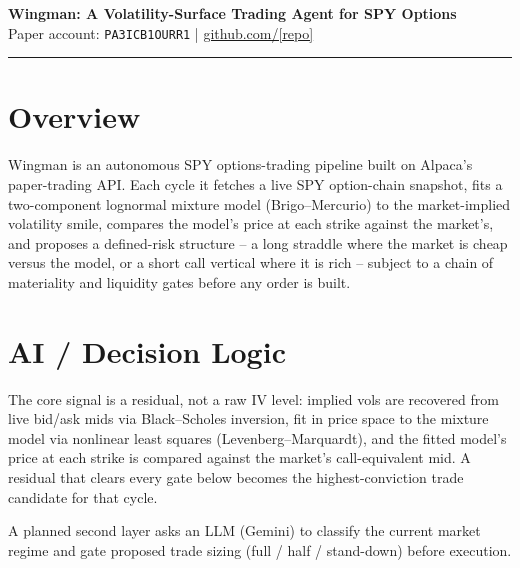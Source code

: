 \documentclass[10pt]{article}
\begin{document}
\begin{center}
{\LARGE \textbf{Wingman: A Volatility-Surface Trading Agent for SPY Options}}\\[4pt]
Paper account: \texttt{PA3ICB1OURR1} \quad|\quad
\href{https://github.com/}{github.com/[repo]}
\end{center}

\vspace{2pt}
\hrule
\vspace{6pt}

\section*{Overview}
Wingman is an autonomous SPY options-trading pipeline built on Alpaca's paper-trading
API. Each cycle it fetches a live SPY option-chain snapshot, fits a two-component
lognormal mixture model (Brigo--Mercurio) to the market-implied volatility smile,
compares the model's price at each strike against the market's, and proposes a
defined-risk structure -- a long straddle where the market is cheap versus the model,
or a short call vertical where it is rich -- subject to a chain of materiality and
liquidity gates before any order is built.

\section*{AI / Decision Logic}
The core signal is a residual, not a raw IV level: implied vols are recovered from
live bid/ask mids via Black--Scholes inversion, fit in price space to the mixture
model via nonlinear least squares (Levenberg--Marquardt), and the fitted model's
price at each strike is compared against the market's call-equivalent mid. A
residual that clears every gate below becomes the highest-conviction trade
candidate for that cycle.

A planned second layer asks an LLM (Gemini) to classify the current market regime
and gate proposed trade sizing (full / half / stand-down) before execution.
\end{document}
